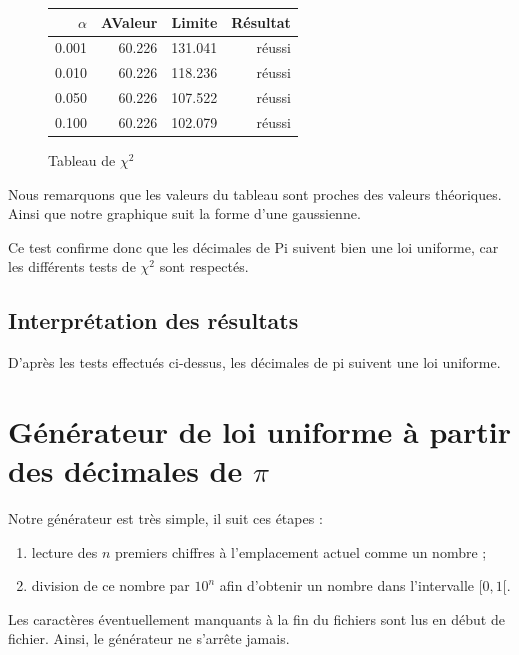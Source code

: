 \documentclass[10pt,a4paper]{article}
\begin{document}

\newpage



\begin{figure}[h]
\centering
\begin{tabular}{|r|r|r|r|}
\hline
$\alpha$ & AValeur & Limite & Résultat\\
\hline
0.001 & 60.226 & 131.041 & réussi\\
0.010 & 60.226 & 118.236 & réussi\\
0.050 & 60.226 & 107.522 & réussi\\
0.100 & 60.226 & 102.079 & réussi\\
\hline
\end{tabular}
\caption{Tableau de $\chi^2$}
\end{figure}


Nous remarquons que les valeurs du tableau sont proches des valeurs théoriques. Ainsi que notre graphique suit la forme d'une gaussienne. 

Ce test confirme donc que les décimales de Pi suivent bien une loi uniforme, car les différents tests de $\chi^2$ sont respectés.

\newpage
\subsection{Interprétation des résultats}
D'après les tests effectués ci-dessus, les décimales de pi suivent une loi uniforme.
	
	\newpage
	\section{Générateur de loi uniforme à partir des décimales de $\pi$}
	Notre générateur est très simple, il suit ces étapes :
	\begin{enumerate}
		\item lecture des $n$ premiers chiffres à l'emplacement actuel comme un nombre ;
		\item division de ce nombre par $10^{n}$ afin d'obtenir un nombre dans l'intervalle $[0, 1[$.
	\end{enumerate}
	Les caractères éventuellement manquants à la fin du fichiers sont lus en début de fichier. Ainsi, le générateur ne s'arrête jamais.
	
\end{document}
